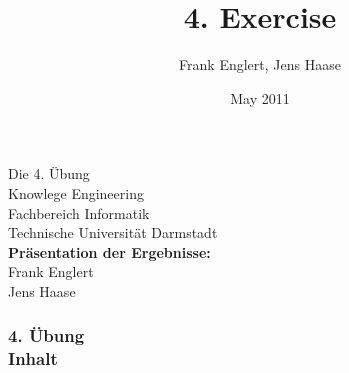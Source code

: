 \documentclass[accentcolor=tud1b,colorbacktitle,inverttitle,landscape,presentation,t]{tudbeamer}
\newcommand{\myframetitle}[2]{\frametitle{#1 \\[.2cm] \small #2}}
\begin{document}
\title[MGA]{\large 4. Exercise}

\author{Frank Englert, Jens Haase}


\date{May 2011}

\begin{titleframe}
\begin{center}
\color{tudtextaccent} \large Die 4. Übung\\[.5cm]
\normalcolor \normalsize Knowlege Engineering \\
Fachbereich Informatik \\
Technische Universität Darmstadt\\[.5cm]

\textbf{Präsentation der Ergebnisse:}\\
Frank Englert\\
Jens Haase
\end{center}

\end{titleframe} 

\begin{frame}[c]
	\myframetitle{4. Übung}{Inhalt}
\end{frame}





\end{document}
